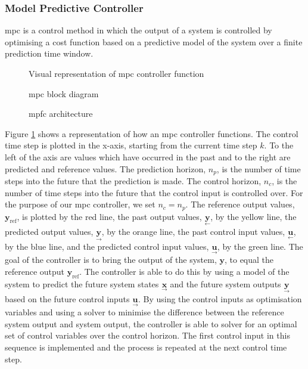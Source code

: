 \documentclass[conference]{IEEEtran}
\begin{document}
\subsubsection{Model Predictive Controller} \label{subsubsec:MPC}

\gls{mpc} is a control method in which the output of a system is controlled by optimising a cost function based on a predictive model of the system over a finite prediction time window.

\begin{figure}
    \centering
      
    \caption{Visual representation of \gls{mpc} controller function}
    \label{fig:diagram_mpc_visualisation}
\end{figure}

\begin{figure}
    \centering
    
    \caption{\gls{mpc} block diagram}
    \label{fig:diagram_mpc}
\end{figure}

\begin{figure*}
    \centering
    
    \caption{\gls{mpfc} architecture}
    \label{fig:diagram_mpfc}
\end{figure*}

Figure \ref{fig:diagram_mpc_visualisation} shows a representation of how an \gls{mpc} controller functions.
The control time step is plotted in the x-axis, starting from the current time step $k$.
To the left of the axis are values which have occurred in the past and to the right are predicted and reference values.
The prediction horizon, $n_{p}$, is the number of time steps into the future that the prediction is made.
The control horizon, $n_{c}$, is the number of time steps into the future that the control input is controlled over.
For the purpose of our \gls{mpc} controller, we set $n_{c} = n_{p}$.
The reference output values, $\bm{y}_{\text{ref}}$, is plotted by the red line, the past output values, $\underset{\leftarrow}{\bm{y}}$, by the yellow line, the predicted output values, $\underset{\rightarrow}{\bm{y}}$, by the orange line, the past control input values, $\underset{\leftarrow}{\bm{u}}$, by the blue line, and the predicted control input values, $\underset{\rightarrow}{\bm{u}}$, by the green line.
The goal of the controller is to bring the output of the system, $\bm{y}$, to equal the reference output $\bm{y}_{\text{ref}}$.
The controller is able to do this by using a model of the system to predict the future system states $\underset{\rightarrow}{\bm{x}}$ and the future system outputs $\underset{\rightarrow}{\bm{y}}$ based on the future control inputs $\underset{\rightarrow}{\bm{u}}$.
By using the control inputs as optimisation variables and using a solver to minimise the difference between the reference system output and system output, the controller is able to solver for an optimal set of control variables over the control horizon.
The first control input in this sequence is implemented and the process is repeated at the next control time step.
 
\end{document}
